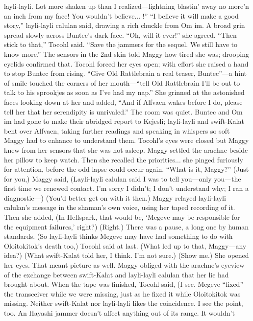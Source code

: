 \documentclass[9pt]{article}
\begin{document}
layli-layli. Lot more shaken up than I realized—lightning blastin’ away no more’n an inch from my face!
You wouldn’t believe... !”
“I believe it will make a good story,” layli-layli calulan said, drawing a rich chuckle from Om im.
A broad grin spread slowly across Buntec’s dark face. “Oh, will it ever!” she agreed.
“Then stick to that,” Tocohl said. “Save the jammers for the sequel. We still have to know more.”
The sensors in the 2nd skin told Maggy how tired she was; drooping eyelids confirmed that.
Tocohl forced her eyes open; with effort she raised a hand to stop Buntec from rising. “Give Old
Rattlebrain a real teaser, Buntec”—a hint of smile touched the corners of her mouth—“tell Old
Rattlebrain I’ll be out to talk to his sprookjes as soon as I’ve had my nap.”
She grinned at the astonished faces looking down at her and added, “And if Alfvaen wakes before I
do, please tell her that her serendipity is unrivaled.”
The room was quiet. Buntec and Om im had gone to make their abridged report to Kejesli;
layli-layli and swift-Kalat bent over Alfvaen, taking further readings and speaking in whispers so soft
Maggy had to enhance to understand them.
Tocohl’s eyes were closed but Maggy knew from her sensors that she was not asleep. Maggy settled
the arachne beside her pillow to keep watch. Then she recalled the priorities... she pinged furiously for
attention, before the odd lapse could occur again.
“What is it, Maggy?”
(Just for you,) Maggy said, (Layli-layli calulan said I was to tell you—only you—the first time we
renewed contact. I’m sorry I didn’t; I don’t understand why; I ran a diagnostic—)
(You’d better get on with it then.)
Maggy relayed layli-layli calulan’s message in the shaman’s own voice, using her taped recording
of it. Then she added, (In Hellspark, that would be, ‘Megeve may be responsible for the equipment
failures,’ right?)
(Right.) There was a pause, a long one by human standards. (So layli-layli thinks Megeve may have
had something to do with Oloitokitok’s death too,) Tocohl said at last. (What led up to that,
Maggy—any idea?)
(What swift-Kalat told her, I think. I’m not sure.)
(Show me.) She opened her eyes.
That meant picture as well. Maggy obliged with the arachne’s eyeview of the exchange between
swift-Kalat and layli-layli calulan that her lie had brought about.
When the tape was finished, Tocohl said, (I see. Megeve “fixed” the transceiver while we were
missing, just as he fixed it while Oloitokitok was missing. Neither swift-Kalat nor layli-layli likes the
coincidence. I see the point, too. An Hayashi jammer doesn’t affect anything out of its range. It wouldn’t
\end{document}
